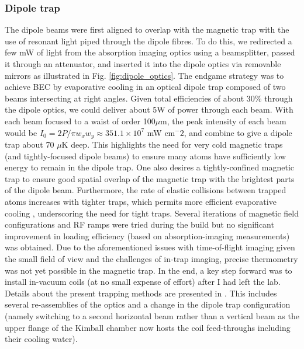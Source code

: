 \subsubsection{Dipole trap}
\label{sec:dipole_trap}

	The dipole beams were first aligned to overlap with the magnetic trap with the use of resonant light piped through the dipole fibres.
	To do this, we redirected a few mW of light from the absorption imaging optics using a beamsplitter, passed it through an attenuator, and inserted it into the dipole optics via removable mirrors as illustrated in Fig.	\ref{fig:dipole_optics}.
	The endgame strategy was to achieve BEC by evaporative cooling in an optical dipole trap composed of two beams intersecting at right angles.
	Given total efficiencies of about 30\% through the dipole optics, we could deliver about 5W of power through each beam.
	With each beam focused to a waist of order 100$ \mu$m, the peak intensity of each beam would be $I_0 = 2P/\pi w_x w_y \approx 351.1\times10^7$ mW cm$^-2$, and combine to give a dipole trap about 70 $\mu$K deep.
	This highlights the need for very cold magnetic traps (and tightly-focused dipole beams) to ensure many atoms have sufficiently low energy to remain in the dipole trap.
	One also desires a tightly-confined magnetic trap to ensure good spatial overlap of the magnetic trap with the brightest parts of the dipole beam.
	Furthermore, the rate of elastic collisions between trapped atoms increases with tighter traps, which permits more efficient evaporative cooling \cite{Ketterle96}, underscoring the need for tight traps.
	Several iterations of magnetic field configurations and RF ramps were tried during the build but no significant improvement in loading efficiency (based on absorption-imaging measurements) was obtained.
	Due to the aforementioned issues with time-of-flight imaging given the small field of view and the challenges of in-trap imaging, precise thermometry was not yet possible in the magnetic trap.  
	In the end, a key step forward was to install in-vacuum coils (at no small expense of effort) after I had left the lab.
	Details about the present trapping methods are presented in \cite{Abbas21}.
	This includes several re-assemblies of the optics and a change in the dipole trap configuration (namely switching to a second horizontal beam rather than a vertical beam as the upper flange of the Kimball chamber now hosts the coil feed-throughs including their cooling water).
	
